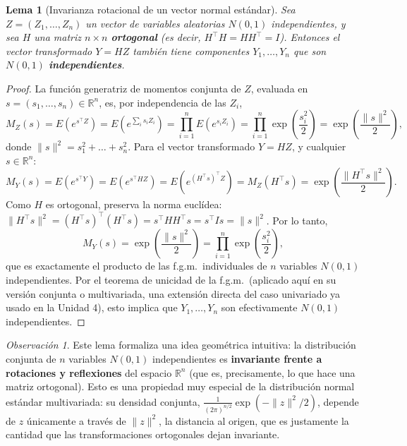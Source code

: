 \documentclass[11pt,a4paper]{article}
\theoremstyle{plain}
\newtheorem{lema}[teorema]{Lema}
\theoremstyle{definition}
\theoremstyle{remark}
\newtheorem{observacion}[teorema]{Observación}
\begin{document}
\begin{lema}[Invarianza rotacional de un vector normal estándar]
\label{lema:rotacion}
Sea $Z=(Z_1,\dots,Z_n)$ un vector de variables aleatorias $N(0,1)$ independientes, y sea $H$ una matriz $n\times n$ \textbf{ortogonal} (es decir, $H^\top H = H H^\top = I$). Entonces el vector transformado $Y = HZ$ también tiene componentes $Y_1,\dots,Y_n$ que son $N(0,1)$ \textbf{independientes}.
\end{lema}

\begin{proof}
La función generatriz de momentos conjunta de $Z$, evaluada en $s=(s_1,\dots,s_n)\in\mathbb{R}^n$, es, por independencia de las $Z_i$,
$$M_Z(s) = E\left(e^{s^\top Z}\right) = E\left(e^{\sum_i s_i Z_i}\right) = \prod_{i=1}^n E\left(e^{s_i Z_i}\right) = \prod_{i=1}^n \exp\left(\frac{s_i^2}{2}\right) = \exp\left(\frac{\|s\|^2}{2}\right),$$
donde $\|s\|^2=s_1^2+\dots+s_n^2$. Para el vector transformado $Y=HZ$, y cualquier $s\in\mathbb{R}^n$:
$$M_Y(s) = E\left(e^{s^\top Y}\right) = E\left(e^{s^\top H Z}\right) = E\left(e^{(H^\top s)^\top Z}\right) = M_Z(H^\top s) = \exp\left(\frac{\|H^\top s\|^2}{2}\right).$$
Como $H$ es ortogonal, preserva la norma euclídea: $\|H^\top s\|^2 = (H^\top s)^\top(H^\top s) = s^\top H H^\top s = s^\top I s = \|s\|^2$. Por lo tanto,
$$M_Y(s) = \exp\left(\frac{\|s\|^2}{2}\right) = \prod_{i=1}^n \exp\left(\frac{s_i^2}{2}\right),$$
que es exactamente el producto de las f.g.m.\ individuales de $n$ variables $N(0,1)$ independientes. Por el teorema de unicidad de la f.g.m.\ (aplicado aquí en su versión conjunta o multivariada, una extensión directa del caso univariado ya usado en la Unidad 4), esto implica que $Y_1,\dots,Y_n$ son efectivamente $N(0,1)$ independientes. \qedhere
\end{proof}

\begin{observacion}
Este lema formaliza una idea geométrica intuitiva: la distribución conjunta de $n$ variables $N(0,1)$ independientes es \textbf{invariante frente a rotaciones y reflexiones} del espacio $\mathbb{R}^n$ (que es, precisamente, lo que hace una matriz ortogonal). Esto es una propiedad muy especial de la distribución normal estándar multivariada: su densidad conjunta, $\frac{1}{(2\pi)^{n/2}}\exp(-\|z\|^2/2)$, depende de $z$ únicamente a través de $\|z\|^2$, la distancia al origen, que es justamente la cantidad que las transformaciones ortogonales dejan invariante.
\end{observacion}
\end{document}
